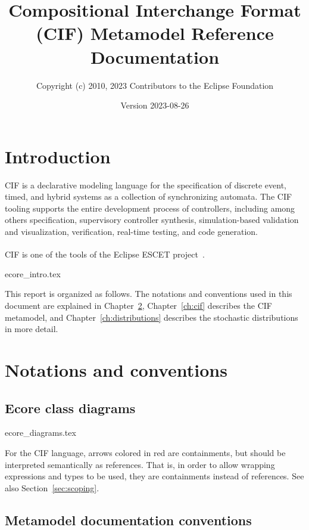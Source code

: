 \documentclass{report}
\title{Compositional Interchange Format (CIF) Metamodel Reference Documentation}
\author{Copyright (c) 2010, 2023 Contributors to the Eclipse Foundation}
\date{Version 2023-08-26}
\begin{document}
\maketitle
\tableofcontents

\chapter{Introduction}
CIF is a declarative modeling language for the specification of discrete
event, timed, and hybrid systems as a collection of synchronizing automata.
The CIF tooling supports the entire development process of controllers,
including among others specification, supervisory controller synthesis,
simulation-based validation and visualization, verification, real-time
testing, and code generation.

CIF is one of the tools of the Eclipse ESCET\textsuperscript{\texttrademark{}}
project~\cite{Eclipse:ESCET}.


       {ecore_intro.tex}

This report is organized as follows. The notations and conventions used in
this document are explained in Chapter~\ref{ch:notations-conventions},
Chapter~\ref{ch:cif} describes the CIF metamodel, and
Chapter~\ref{ch:distributions} describes the stochastic distributions in more
detail.


\chapter{Notations and conventions}\label{ch:notations-conventions}

\section{Ecore class diagrams}


       {ecore_diagrams.tex}

For the CIF language, arrows colored in red are containments, but should
be interpreted semantically as references. That is, in order to allow
wrapping expressions and types to be used, they are containments instead of
references. See also Section~\ref{sec:scoping}.


\section{Metamodel documentation conventions}
\end{document}
